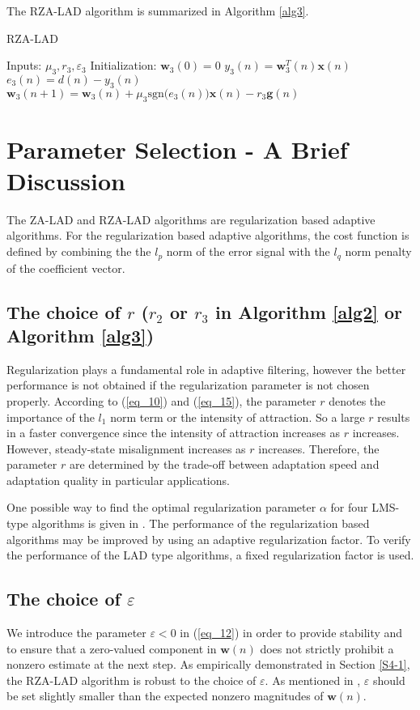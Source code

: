 \documentclass[conference]{IEEEtran}
\begin{document}
The RZA-LAD algorithm is summarized in Algorithm \ref{alg3}.
\newpage
\begin{algorithm}[!h]
\caption{RZA-LAD}
\label{alg3}
\begin{algorithmic}
\STATE   Inputs:  $\mu_3,  r_3, \varepsilon_3$
\STATE  Initialization:  $\mathbf{w}_3(0)=0$
\STATE $y_3(n)  =  \mathbf{w}^T_3(n)\mathbf{x}(n)$
\STATE $e_3(n)  = d(n) - y_3(n)$
\STATE $\mathbf{w}_3(n+1) = \mathbf{w}_3(n) + \mu_3\textrm{sgn} \big(e_3(n)\big)\mathbf{x}(n)  - r_3\mathbf{g}(n)$
\ENDFOR
\end{algorithmic}
\end{algorithm}
\section{Parameter Selection - A Brief Discussion}
\label{S3}
The ZA-LAD and RZA-LAD algorithms are regularization based adaptive algorithms.
For the regularization based adaptive algorithms, the cost function is defined by combining the the $l_p$ norm of the error signal with the $l_q$ norm penalty of the coefficient vector. 


\subsection{The choice of $r$ ($r_2$ or $r_3$ in Algorithm \ref{alg2} or Algorithm \ref{alg3})}
\label{S3-1}
Regularization plays a fundamental role in adaptive filtering, however the better performance is not obtained if the regularization parameter is not 
chosen properly. According to  (\ref{eq_10}) and (\ref{eq_15}), the parameter $r$ denotes the importance of the $l_1$ norm term or the intensity of attraction. So a large $r$ results in a faster convergence since the intensity of attraction increases as $r$ increases. However, steady-state misalignment increases as $r$ increases. Therefore, the parameter $r$ are determined by the trade-off between adaptation speed and adaptation quality in particular applications. 

One possible way to find the optimal regularization parameter $\alpha$ for four LMS-type algorithms is given in \cite{ref22}. The performance of the regularization based algorithms may be improved by using an adaptive regularization factor. To verify the performance of the LAD type algorithms, a fixed regularization factor is used.

\subsection{The choice of $\varepsilon$}
\label{S3-2}
We introduce the parameter $\varepsilon < 0$ in (\ref{eq_12}) in order to provide stability and
to ensure that a zero-valued component in $\mathbf{w}(n)$ does not strictly prohibit a
nonzero estimate at the next step. As empirically demonstrated in Section \ref{S4-1}, the RZA-LAD algorithm is robust to the choice of $\varepsilon$.
As mentioned in \cite{refrl}, $\varepsilon$ should be set slightly smaller than the expected nonzero magnitudes of $\mathbf{w}(n)$.
\end{document}
